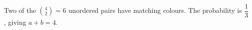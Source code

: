 Two of the $\binom42=6$ unordered pairs have matching colours. The probability is $\dfrac{1}{3}$, giving $\boxed{a+b=4}$.
